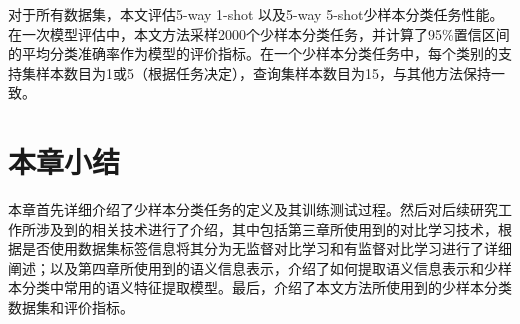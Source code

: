 对于所有数据集，本文评估5-way 1-shot 以及5-way 5-shot少样本分类任务性能。在一次模型评估中，本文方法采样2000个少样本分类任务，并计算了95\%置信区间的平均分类准确率作为模型的评价指标。在一个少样本分类任务中，每个类别的支持集样本数目为1或5（根据任务决定），查询集样本数目为15，与其他方法\cite{RFS, IER}保持一致。

\section[\hspace{-2pt}本章小结]{{\heiti{} \hspace{-8pt}本章小结}}\label{section2: 本章小结}

本章首先详细介绍了少样本分类任务的定义及其训练测试过程。然后对后续研究工作所涉及到的相关技术进行了介绍，其中包括第三章所使用到的对比学习技术，根据是否使用数据集标签信息将其分为无监督对比学习和有监督对比学习进行了详细阐述；以及第四章所使用到的语义信息表示，介绍了如何提取语义信息表示和少样本分类中常用的语义特征提取模型。最后，介绍了本文方法所使用到的少样本分类数据集和评价指标。

